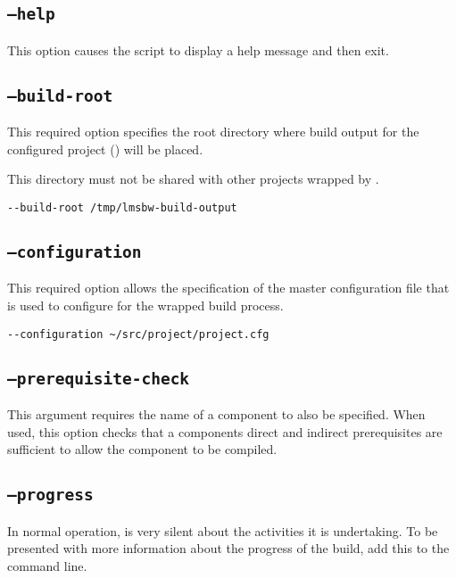 \subsection{\texttt{--help}}

This option causes the script to display a help message and then exit.

\subsection{\texttt{--build-root}}

This required option specifies the root directory where build output
for the configured project () will be
placed.

This directory must not be shared with other projects wrapped by
\lmsbw.

\begin{verbatim}
--build-root /tmp/lmsbw-build-output
\end{verbatim}

\subsection{\texttt{--configuration}}\label{lmsbw:configuration}

This required option allows the specification of the master
configuration file that is used to configure \lmsbw for the wrapped
build process.

\begin{verbatim}
--configuration ~/src/project/project.cfg
\end{verbatim}


\subsection{\texttt{--prerequisite-check}}\label{usinglmsbw:prerequisite-check}

This argument requires the name of a component to also be specified.
When used, this option checks that a components direct and indirect
prerequisites are sufficient to allow the component to be compiled.

\subsection{\texttt{--progress}}\label{usinglmsbw:progress}

In normal operation, \lmsbw is very silent about the activities it is
undertaking.  To be presented with more information about the progress
of the build, add this to the command line.

